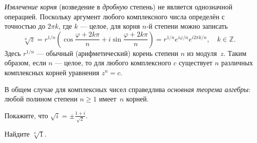 \begin{booksupplement}
    \emph{Извлечение корня} (возведение в \emph{дробную} степень) не является
    однозначной операцией. Поскольку аргумент любого комплексного числа определён
    с точностью до $2\pi k$, где $k$ --- целое, для корня $n$-й степени
    можно записать
    \begin{equation*}
        \sqrt[n]{z} = r^{1/n}\left( \cos\frac{\varphi + 2k\pi}{n} +
        i\sin\frac{\varphi + 2k\pi}{n} \right) = r^{1/n} e^{i\varphi/n}
        e^{i2\pi k/n},\quad k\in \mathbb{Z}.
    \end{equation*}
    Здесь $r^{1/n}$ --- обычный (арифметический) корень степени $n$ из модуля~$z$. 
    Таким образом, если $n$ --- целое, то для любого комплексного $c$
    существует $n$ различных комплексных корней уравнения $z^n=c$. 

    В общем случае для комплексных чисел справедлива
    \emph{основная теорема алгебры}: любой полином степени $n\ge 1$ имеет~$n$
    корней.

    \begin{lab:exercise}
     Покажите, что $\sqrt{i}=\pm \frac{1+i}{\sqrt{2}}$.
    \end{lab:exercise}
    \begin{lab:exercise}
     Найдите $\sqrt[n]{1}$.
    \end{lab:exercise}

\end{booksupplement}
